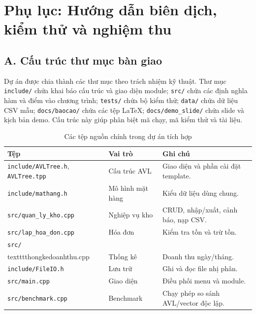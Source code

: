 \chapter*{Phụ lục: Hướng dẫn biên dịch, kiểm thử và nghiệm thu}

\section*{A. Cấu trúc thư mục bàn giao}
Dự án được chia thành các thư mục theo trách nhiệm kỹ thuật. Thư mục \texttt{include/} chứa khai báo cấu trúc và giao diện module; \texttt{src/} chứa các định nghĩa hàm và điểm vào chương trình; \texttt{tests/} chứa bộ kiểm thử; \texttt{data/} chứa dữ liệu CSV mẫu; \texttt{docs/baocao/} chứa các tệp LaTeX; \texttt{docs/demo\_slide/} chứa slide và kịch bản demo. Cấu trúc này giúp phân biệt mã chạy, mã kiểm thử và tài liệu.

\begin{table}[H]
\centering
\caption{Các tệp nguồn chính trong dự án tích hợp}
\small
\begin{tabular}{@{}p{4cm}p{3cm}p{6cm}@{}}
\toprule
\textbf{Tệp} & \textbf{Vai trò} & \textbf{Ghi chú} \\
\midrule
\texttt{include/AVLTree.h}, \texttt{AVLTree.tpp} & Cấu trúc AVL & Giao diện và phần cài đặt template. \\
\texttt{include/mathang.h} & Mô hình mặt hàng & Kiểu dữ liệu dùng chung. \\
\texttt{src/quan\_ly\_kho.cpp} & Nghiệp vụ kho & CRUD, nhập/xuất, cảnh báo, nạp CSV. \\
\texttt{src/lap\_hoa\_don.cpp} & Hóa đơn & Kiểm tra tồn và trừ tồn. \\
\texttt{src/}\\texttt{thongkedoanhthu.cpp} & Thống kê & Doanh thu ngày/tháng. \\
\texttt{include/FileIO.h} & Lưu trữ & Ghi và đọc file nhị phân. \\
\texttt{src/main.cpp} & Giao diện & Điều phối menu và module. \\
\texttt{src/benchmark.cpp} & Benchmark & Chạy phép so sánh AVL/vector độc lập. \\
\bottomrule
\end{tabular}
\end{table}

